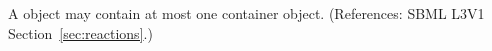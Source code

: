 A \KineticLaw object may contain at most one \ListOfLocalParameters
container object.  (References: SBML L3V1 Section~\ref{sec:reactions}.)
